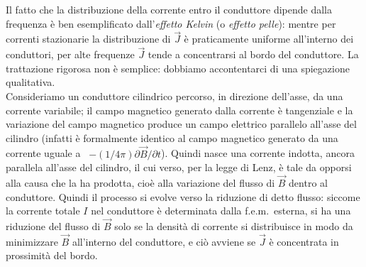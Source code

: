 Il fatto che la distribuzione della corrente entro il conduttore dipende dalla
frequenza \`e ben esemplificato dall'\textit{effetto Kelvin} (o \textit{effetto
pelle}): mentre per correnti stazionarie la distribuzione di $\vec J$ \`e
praticamente uniforme all'interno dei conduttori, per alte frequenze $\vec J$
tende a concentrarsi al bordo del conduttore. La trattazione rigorosa non \`e
semplice: dobbiamo accontentarci di una spiegazione qualitativa.\\
Consideriamo un conduttore cilindrico percorso, in direzione dell'asse, da una
corrente variabile; il campo magnetico generato dalla corrente \`e tangenziale e
la variazione del campo magnetico produce un campo elettrico parallelo all'asse
del cilindro (infatti \`e formalmente identico al campo magnetico generato da
una corrente uguale a \ $-(1/4\pi)\partial\vec B/\partial t$). Quindi nasce una
corrente indotta, ancora parallela all'asse del cilindro, il cui verso, per la
legge di Lenz, \`e tale da opporsi alla causa che la ha prodotta, cio\`e alla
variazione del flusso di $\vec B$ dentro al conduttore. Quindi il processo si
evolve verso la riduzione di detto flusso: siccome la corrente totale $I$ nel
conduttore \`e determinata dalla f.e.m.\ esterna, si ha una riduzione del flusso
di $\vec B$ solo se la densit\`a di corrente si distribuisce in modo da
minimizzare $\vec B$ all'interno del conduttore, e ci\`o avviene se $\vec J$ \`e
concentrata in prossimit\`a del bordo.

